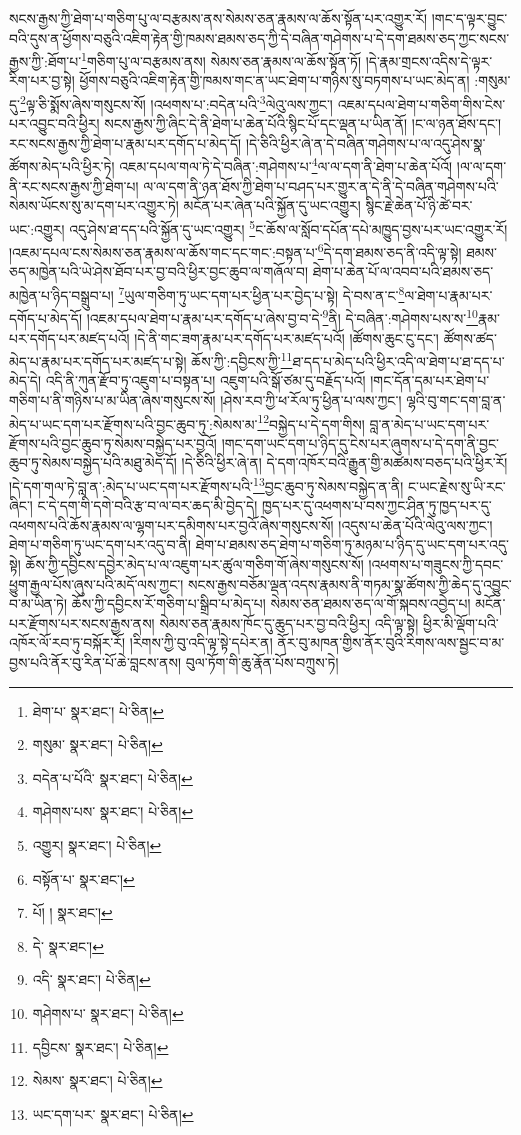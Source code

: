 སངས་རྒྱས་ཀྱི་ཐེག་པ་གཅིག་པུ་ལ་བརྩམས་ནས་སེམས་ཅན་རྣམས་ལ་ཆོས་སྟོན་པར་འགྱུར་རོ། །གང་ད་ལྟར་བྱུང་བའི་དུས་ན་ཕྱོགས་བཅུའི་འཇིག་རྟེན་གྱི་ཁམས་ཐམས་ཅད་ཀྱི་དེ་བཞིན་གཤེགས་པ་དེ་དག་ཐམས་ཅད་ཀྱང་སངས་རྒྱས་ཀྱི་:ཐོག་པ་\footnote{ཐེག་པ་  སྣར་ཐང་།  པེ་ཅིན། }གཅིག་པུ་ལ་བརྩམས་ནས། སེམས་ཅན་རྣམས་ལ་ཆོས་སྟོན་ཏོ། །དེ་རྣམ་གྲངས་འདིས་དེ་ལྟར་རིག་པར་བྱ་སྟེ། ཕྱོགས་བཅུའི་འཇིག་རྟེན་གྱི་ཁམས་གང་ན་ཡང་ཐེག་པ་གཉིས་སུ་བཏགས་པ་ཡང་མེད་ན། :གསུམ་དུ་\footnote{གསུམ་  སྣར་ཐང་།  པེ་ཅིན། }ལྟ་ཅི་སྨོས་ཞེས་གསུངས་སོ། །འཕགས་པ་:བདེན་པའི་\footnote{བདེན་པ་པོའི་  སྣར་ཐང་།  པེ་ཅིན། }ལེའུ་ལས་ཀྱང་། འཇམ་དཔལ་ཐེག་པ་གཅིག་གིས་ངེས་པར་འབྱུང་བའི་ཕྱིར། སངས་རྒྱས་ཀྱི་ཞིང་དེ་ནི་ཐེག་པ་ཆེན་པོའི་སྙིང་པོ་དང་ལྡན་པ་ཡིན་ནོ། །ང་ལ་ཉན་ཐོས་དང་། རང་སངས་རྒྱས་ཀྱི་ཐེག་པ་རྣམ་པར་དགོད་པ་མེད་དོ། །དེ་ཅིའི་ཕྱིར་ཞེ་ན་དེ་བཞིན་གཤེགས་པ་ལ་འདུ་ཤེས་སྣ་ཚོགས་མེད་པའི་ཕྱིར་ཏེ། འཇམ་དཔལ་གལ་ཏེ་དེ་བཞིན་:གཤེགས་པ་\footnote{གཤེགས་པས་  སྣར་ཐང་།  པེ་ཅིན། }ལ་ལ་དག་ནི་ཐེག་པ་ཆེན་པོའོ། །ལ་ལ་དག་ནི་རང་སངས་རྒྱས་ཀྱི་ཐེག་པ། ལ་ལ་དག་ནི་ཉན་ཐོས་ཀྱི་ཐེག་པ་བཤད་པར་གྱུར་ན་དེ་ནི་དེ་བཞིན་གཤེགས་པའི་སེམས་ཡོངས་སུ་མ་དག་པར་འགྱུར་ཏེ། མངོན་པར་ཞེན་པའི་སྐྱོན་དུ་ཡང་འགྱུར། སྙིང་རྗེ་ཆེན་པོ་ཉི་ཚེ་བར་ཡང་:འགྱུར། འདུ་ཤེས་ཐ་དད་པའི་སྐྱོན་དུ་ཡང་འགྱུར། \footnote{འགྱུར།    སྣར་ཐང་།  པེ་ཅིན། }ང་ཆོས་ལ་སློབ་དཔོན་དཔེ་མཁྱུད་བྱས་པར་ཡང་འགྱུར་རོ། །འཇམ་དཔལ་ངས་སེམས་ཅན་རྣམས་ལ་ཆོས་གང་དང་གང་:བསྟན་པ་\footnote{བསྟོན་པ་  སྣར་ཐང་། }དེ་དག་ཐམས་ཅད་ནི་འདི་ལྟ་སྟེ། ཐམས་ཅད་མཁྱེན་པའི་ཡེ་ཤེས་ཐོབ་པར་བྱ་བའི་ཕྱིར་བྱང་ཆུབ་ལ་གཞོལ་བ། ཐེག་པ་ཆེན་པོ་ལ་འབབ་པའི་ཐམས་ཅད་མཁྱེན་པ་ཉིད་བསྒྲུབ་པ། \footnote{པོ། །   སྣར་ཐང་། }ཡུལ་གཅིག་ཏུ་ཡང་དག་པར་ཕྱིན་པར་བྱེད་པ་སྟེ། དེ་བས་ན་ང་\footnote{དེ་  སྣར་ཐང་། }ལ་ཐེག་པ་རྣམ་པར་དགོད་པ་མེད་དོ། །འཇམ་དཔལ་ཐེག་པ་རྣམ་པར་དགོད་པ་ཞེས་བྱ་བ་དེ་\footnote{འདི་  སྣར་ཐང་།  པེ་ཅིན། }ནི། དེ་བཞིན་:གཤེགས་པས་ས་\footnote{གཤེགས་པ་  སྣར་ཐང་།  པེ་ཅིན། }རྣམ་པར་དགོད་པར་མཛད་པའོ། །དེ་ནི་གང་ཟག་རྣམ་པར་དགོད་པར་མཛད་པའོ། །ཚོགས་ཆུང་ངུ་དང་། ཚོགས་ཚད་མེད་པ་རྣམ་པར་དགོད་པར་མཛད་པ་སྟེ། ཆོས་ཀྱི་:དབྱིངས་ཀྱི་\footnote{དབྱིངས་  སྣར་ཐང་།  པེ་ཅིན། }ཐ་དད་པ་མེད་པའི་ཕྱིར་འདི་ལ་ཐེག་པ་ཐ་དད་པ་མེད་དེ། འདི་ནི་ཀུན་རྫོབ་ཏུ་འཇུག་པ་བསྟན་པ། འཇུག་པའི་སྒོ་ཙམ་དུ་བརྗོད་པའོ། །གང་དོན་དམ་པར་ཐེག་པ་གཅིག་པ་ནི་གཉིས་པ་མ་ཡིན་ཞེས་གསུངས་སོ། །ཤེས་རབ་ཀྱི་ཕ་རོལ་ཏུ་ཕྱིན་པ་ལས་ཀྱང་། ལྷའི་བུ་གང་དག་བླ་ན་མེད་པ་ཡང་དག་པར་རྫོགས་པའི་བྱང་ཆུབ་ཏུ་:སེམས་མ་\footnote{སེམས་  སྣར་ཐང་།  པེ་ཅིན། }བསྐྱེད་པ་དེ་དག་གིས། བླ་ན་མེད་པ་ཡང་དག་པར་རྫོགས་པའི་བྱང་ཆུབ་ཏུ་སེམས་བསྐྱེད་པར་བྱའོ། །གང་དག་ཡང་དག་པ་ཉིད་དུ་ངེས་པར་ཞུགས་པ་དེ་དག་ནི་བྱང་ཆུབ་ཏུ་སེམས་བསྐྱེད་པའི་མཐུ་མེད་དོ། །དེ་ཅིའི་ཕྱིར་ཞེ་ན། དེ་དག་འཁོར་བའི་རྒྱུན་གྱི་མཚམས་བཅད་པའི་ཕྱིར་རོ། །དེ་དག་གལ་ཏེ་བླ་ན་:མེད་པ་ཡང་དག་པར་རྫོགས་པའི་\footnote{ཡང་དག་པར་  སྣར་ཐང་།  པེ་ཅིན། }བྱང་ཆུབ་ཏུ་སེམས་བསྐྱེད་ན་ནི། ང་ཡང་རྗེས་སུ་ཡི་རང་ཞིང་། ང་དེ་དག་གི་དགེ་བའི་རྩ་བ་ལ་བར་ཆད་མི་བྱེད་དེ། ཁྱད་པར་དུ་འཕགས་པ་བས་ཀྱང་ཤིན་ཏུ་ཁྱད་པར་དུ་འཕགས་པའི་ཆོས་རྣམས་ལ་ལྷག་པར་དམིགས་པར་བྱའོ་ཞེས་གསུངས་སོ། །འདུས་པ་ཆེན་པོའི་ལེའུ་ལས་ཀྱང་། ཐེག་པ་གཅིག་ཏུ་ཡང་དག་པར་འདུ་བ་ནི། ཐེག་པ་ཐམས་ཅད་ཐེག་པ་གཅིག་ཏུ་མཉམ་པ་ཉིད་དུ་ཡང་དག་པར་འདུ་སྟེ། ཆོས་ཀྱི་དབྱིངས་དབྱེར་མེད་པ་ལ་འཇུག་པར་ཚུལ་གཅིག་གོ་ཞེས་གསུངས་སོ། །འཕགས་པ་གཟུངས་ཀྱི་དབང་ཕྱུག་རྒྱལ་པོས་ཞུས་པའི་མདོ་ལས་ཀྱང་། སངས་རྒྱས་བཅོམ་ལྡན་འདས་རྣམས་ནི་གཏམ་སྣ་ཚོགས་ཀྱི་ཆེད་དུ་འབྱུང་བ་མ་ཡིན་ཏེ། ཆོས་ཀྱི་དབྱིངས་རོ་གཅིག་པ་སྒྲིབ་པ་མེད་པ། སེམས་ཅན་ཐམས་ཅད་ལ་གོ་སྐབས་འབྱེད་པ། མངོན་པར་རྫོགས་པར་སངས་རྒྱས་ནས། སེམས་ཅན་རྣམས་ཁོང་དུ་ཆུད་པར་བྱ་བའི་ཕྱིར། འདི་ལྟ་སྟེ། ཕྱིར་མི་ལྡོག་པའི་འཁོར་ལོ་རབ་ཏུ་བསྐོར་རོ། །རིགས་ཀྱི་བུ་འདི་ལྟ་སྟེ་དཔེར་ན། ནོར་བུ་མཁན་གྱིས་ནོར་བུའི་རིགས་ལས་སྦྱང་བ་མ་བྱས་པའི་ནོར་བུ་རིན་པོ་ཆེ་བླངས་ནས། བུལ་ཏོག་གི་ཆུ་རྣོན་པོས་བཀྲུས་ཏེ། 